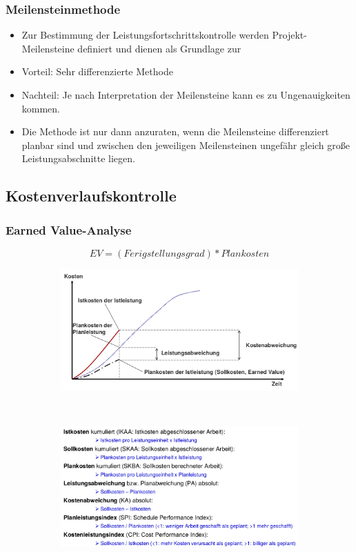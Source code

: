 \documentclass[11pt,a4paper]{article}
\begin{document}
\subsubsection{Meilensteinmethode}

\begin{itemize}
	\item Zur Bestimmung der Leistungsfortschrittskontrolle werden Projekt-
Meilensteine definiert und dienen als Grundlage zur
	\item Vorteil: Sehr differenzierte Methode
	\item Nachteil: Je nach Interpretation der Meilensteine kann es zu Ungenauigkeiten
kommen.
	\item Die Methode ist nur dann anzuraten, wenn die Meilensteine
differenziert planbar sind und zwischen den jeweiligen Meilensteinen
ungefähr gleich große Leistungsabschnitte liegen.
\end{itemize}

\subsection{Kostenverlaufskontrolle}

\subsubsection{Earned Value-Analyse}

$$ EV = (Ferigstellungsgrad)*Plankosten$$

\begin{figure}[H]
	\centering
	\begin{subfigure}{0.49\textwidth}
		\includegraphics[width=\textwidth]{ch11/evagraf}
	\end{subfigure}
	~
	\begin{subfigure}{0.49\textwidth}
		\includegraphics[width=\textwidth]{ch11/kosten}
	\end{subfigure}
\end{figure}
\end{document}
